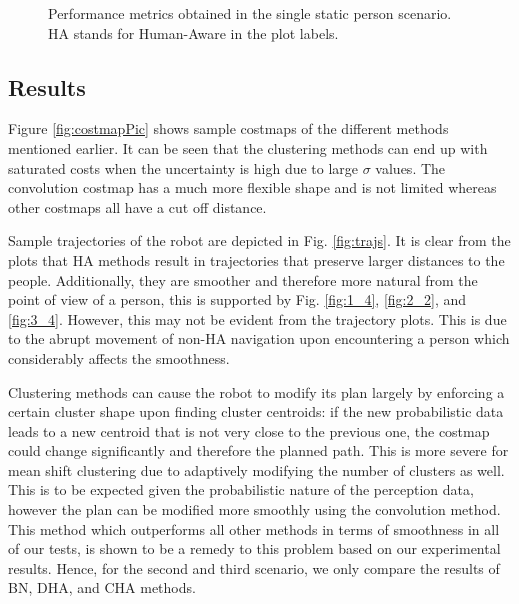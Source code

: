 \begin{figure}
\caption{Performance metrics obtained in the single static person scenario. HA stands for Human-Aware in the plot labels.
}
\label{fig:boxplots_singlePerson}
\end{figure}

\subsection{Results}
\label{sec:results}
Figure \ref{fig:costmapPic} shows sample costmaps of the different methods mentioned earlier. It can be seen that the clustering methods can end up with saturated costs when the uncertainty is high due to large $\sigma$ values. The convolution costmap has a much more flexible shape and is not limited whereas other costmaps all have a cut off distance.

Sample trajectories of the robot are depicted in Fig. \ref{fig:trajs}. It is clear from the plots that HA methods result in trajectories that preserve larger distances to the people.
Additionally, they are smoother and therefore more natural from the point of view of a person, this is supported by Fig. \ref{fig:1_4}, \ref{fig:2_2}, and \ref{fig:3_4}. However, this may not be evident from the trajectory plots. This is due to the abrupt movement of non-HA navigation upon encountering a person which considerably affects the smoothness.

Clustering methods can cause the robot to modify its plan largely by enforcing a certain cluster shape upon finding cluster centroids: if the new probabilistic data leads to a new centroid that is not very close to the previous one, the costmap could change significantly and therefore the planned path. This is more severe for mean shift clustering due to adaptively modifying the number of clusters as well. This is to be expected given the probabilistic nature of the perception data, however the plan can be modified more smoothly using the convolution method. This method which outperforms all other methods in terms of smoothness in all of our tests, is shown to be a remedy to this problem based on our experimental results. Hence, for the second and third scenario, we only compare the results of BN, DHA, and CHA methods.  


